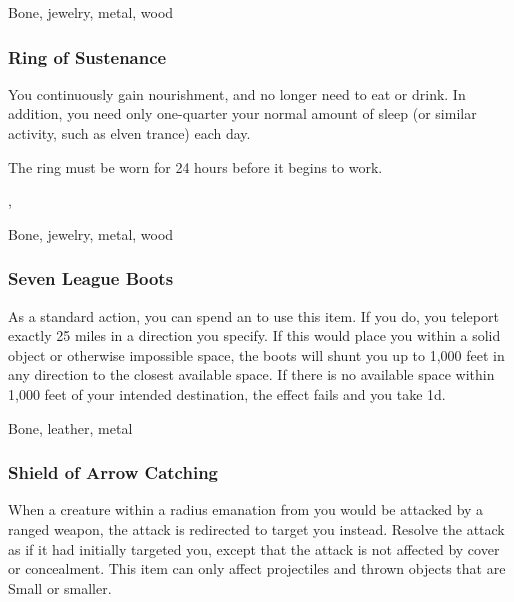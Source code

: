 


 Bone, jewelry, metal, wood


\lowercase{\hypertarget{item:Ring of Sustenance}{}}\label{item:Ring of Sustenance}
\hypertarget{item:Ring of Sustenance}{\subsubsection{Ring of Sustenance\hfill{}}}

You continuously gain nourishment, and no longer need to eat or drink.
In addition, you need only one-quarter your normal amount of sleep (or similar activity, such as elven trance) each day.

The ring must be worn for 24 hours before it begins to work.



 , 


 Bone, jewelry, metal, wood


\lowercase{\hypertarget{item:Seven League Boots}{}}\label{item:Seven League Boots}
\hypertarget{item:Seven League Boots}{\subsubsection{Seven League Boots\hfill{}}}

As a standard action, you can spend an  to use this item.
If you do, you teleport exactly 25 miles in a direction you specify.
If this would place you within a solid object or otherwise impossible space, the boots will shunt you up to 1,000 feet in any direction to the closest available space.
If there is no available space within 1,000 feet of your intended destination, the effect fails and you take  \minus1d.



 


 Bone, leather, metal


\lowercase{\hypertarget{item:Shield of Arrow Catching}{}}\label{item:Shield of Arrow Catching}
\hypertarget{item:Shield of Arrow Catching}{\subsubsection{Shield of Arrow Catching\hfill{}}}

When a creature within a \areamed radius emanation from you would be attacked by a ranged weapon, the attack is redirected to target you instead.
Resolve the attack as if it had initially targeted you, except that the attack is not affected by cover or concealment.
This item can only affect projectiles and thrown objects that are Small or smaller.



